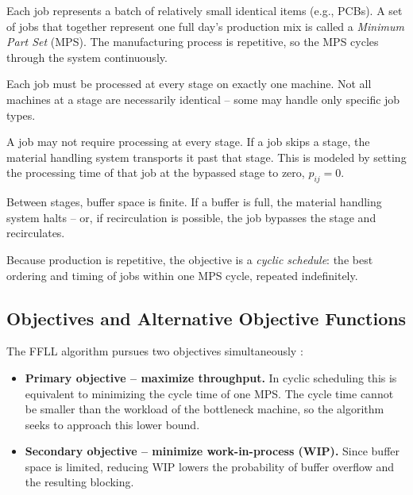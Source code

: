 \documentclass[11pt,a4paper]{article}
\begin{document}
\begin{description}[leftmargin=2.2cm,style=nextline]
  \item[Jobs] Each job represents a batch of relatively small identical
    items (e.g., PCBs). A set of jobs that together represent one full
    day's production mix is called a \emph{Minimum Part Set} (MPS). The
    manufacturing process is repetitive, so the MPS cycles through the
    system continuously.
  \item[Processing] Each job must be processed at every stage on exactly
    one machine. Not all machines at a stage are necessarily identical --
    some may handle only specific job types.
  \item[Bypass] A job may not require processing at every stage. If a job
    skips a stage, the material handling system transports it past that
    stage. This is modeled by setting the processing time of that job at
    the bypassed stage to zero, $p_{ij}=0$.
  \item[Limited buffers] Between stages, buffer space is finite. If a
    buffer is full, the material handling system halts -- or, if
    recirculation is possible, the job bypasses the stage and recirculates.
  \item[Cyclic schedule] Because production is repetitive, the objective
    is a \emph{cyclic schedule}: the best ordering and timing of jobs
    within one MPS cycle, repeated indefinitely.
\end{description}

\subsection{Objectives and Alternative Objective Functions}

The FFLL algorithm pursues two objectives simultaneously
\citep{pinedo2016scheduling}:

\begin{itemize}
  \item \textbf{Primary objective -- maximize throughput.} In cyclic
    scheduling this is equivalent to minimizing the cycle time of one MPS.
    The cycle time cannot be smaller than the workload of the bottleneck
    machine, so the algorithm seeks to approach this lower bound.
  \item \textbf{Secondary objective -- minimize work-in-process (WIP).}
    Since buffer space is limited, reducing WIP lowers the probability of
    buffer overflow and the resulting blocking.
\end{itemize}
\end{document}
